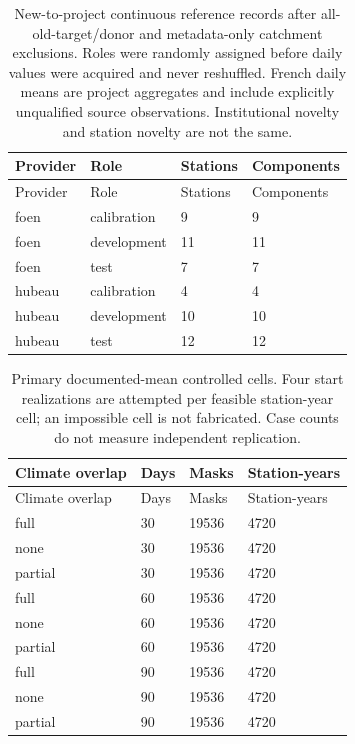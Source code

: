 {\tabletext
\setlength{\tabcolsep}{3pt}
\begin{longtable}{p{}p{}p{}p{}}
\caption{New-to-project continuous reference records after all-old-target/donor and metadata-only catchment exclusions. Roles were randomly assigned before daily values were acquired and never reshuffled. French daily means are project aggregates and include explicitly unqualified source observations. Institutional novelty and station novelty are not the same.}\label{tab:r3si-new_cohort}\\
\toprule
Provider & Role & Stations & Components \\
\midrule
\endfirsthead
\toprule
Provider & Role & Stations & Components \\
\midrule
\endhead
foen & calibration & 9 & 9 \\
foen & development & 11 & 11 \\
foen & test & 7 & 7 \\
hubeau & calibration & 4 & 4 \\
hubeau & development & 10 & 10 \\
hubeau & test & 12 & 12 \\
\bottomrule
\end{longtable}
}

{\tabletext
\setlength{\tabcolsep}{3pt}
\begin{longtable}{p{}p{}p{}p{}}
\caption{Primary documented-mean controlled cells. Four start realizations are attempted per feasible station-year cell; an impossible cell is not fabricated. Case counts do not measure independent replication.}\label{tab:r3si-controlled_cells}\\
\toprule
Climate overlap & Days & Masks & Station-years \\
\midrule
\endfirsthead
\toprule
Climate overlap & Days & Masks & Station-years \\
\midrule
\endhead
full & 30 & 19536 & 4720 \\
none & 30 & 19536 & 4720 \\
partial & 30 & 19536 & 4720 \\
full & 60 & 19536 & 4720 \\
none & 60 & 19536 & 4720 \\
partial & 60 & 19536 & 4720 \\
full & 90 & 19536 & 4720 \\
none & 90 & 19536 & 4720 \\
partial & 90 & 19536 & 4720 \\
\bottomrule
\end{longtable}
}


